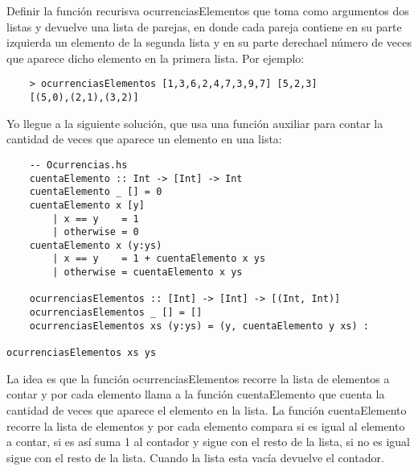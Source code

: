 Definir la función recurisva ocurrenciasElementos que toma
como argumentos dos listas y devuelve una lista de parejas, 
en donde cada pareja contiene en su parte izquierda un elemento 
de la segunda lista y en su parte derechael número de veces que 
aparece dicho elemento en la primera lista. Por ejemplo:

\begin{verbatim}
    > ocurrenciasElementos [1,3,6,2,4,7,3,9,7] [5,2,3]
    [(5,0),(2,1),(3,2)]
\end{verbatim}

Yo llegue a la siguiente solución, que usa una función auxiliar
para contar la cantidad de veces que aparece un elemento en una
lista:
\begin{verbatim}
    -- Ocurrencias.hs
    cuentaElemento :: Int -> [Int] -> Int
    cuentaElemento _ [] = 0
    cuentaElemento x [y]
        | x == y    = 1
        | otherwise = 0
    cuentaElemento x (y:ys)
        | x == y    = 1 + cuentaElemento x ys
        | otherwise = cuentaElemento x ys

    ocurrenciasElementos :: [Int] -> [Int] -> [(Int, Int)]
    ocurrenciasElementos _ [] = []
    ocurrenciasElementos xs (y:ys) = (y, cuentaElemento y xs) : 
                                                    ocurrenciasElementos xs ys
\end{verbatim}

La idea es que la función ocurrenciasElementos recorre la lista
de elementos a contar y por cada elemento llama a la función
cuentaElemento que cuenta la cantidad de veces que aparece el
elemento en la lista. La función cuentaElemento recorre la lista
de elementos y por cada elemento compara si es igual al elemento
a contar, si es así suma 1 al contador y sigue con el resto de la
lista, si no es igual sigue con el resto de la lista. Cuando la
lista esta vacía devuelve el contador.

\vspace{.3cm}